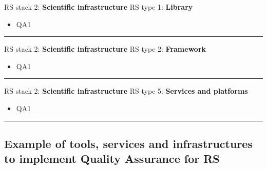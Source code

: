 RS stack 2: \textbf{Scientific infrastructure} \tab RS type 1: \textbf{Library}

\begin{itemize}
    \item QA1
\end{itemize}
\hrule

RS stack 2: \textbf{Scientific infrastructure} \tab RS type 2: \textbf{Framework}

\begin{itemize}
    \item QA1
\end{itemize}
\hrule

RS stack 2: \textbf{Scientific infrastructure} \tab RS type 5: \textbf{Services and platforms}

\begin{itemize}
    \item QA1
\end{itemize}
\hrule


\subsection{Example of tools, services and infrastructures to implement Quality Assurance for RS}

